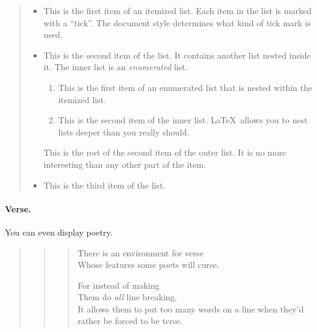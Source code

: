 \begin{quote}
\begin{itemize}
   \item  This is the first item of an itemized list.  Each item
          in the list is marked with a ``tick''.  The document
          style determines what kind of tick mark is used.

   \item  This is the second item of the list.  It contains another
          list nested inside it.  The inner list is an {\em enumerated}
          list.
          \begin{enumerate}
              \item This is the first item of an enumerated list that
                    is nested within the itemized list.

              \item This is the second item of the inner list.  \LaTeX\
                    allows you to nest lists deeper than you really should.
          \end{enumerate}
          This is the rest of the second item of the outer list.  It
          is no more interesting than any other part of the item.
   \item  This is the third item of the list.
\end{itemize}
\end{quote}

\paragraph{Verse.}
You can even display poetry.

\minusline %

\begin{quote}
\begin{quote}
\begin{verse}
   There is an environment for verse \\    %
   Whose features some poets will curse.   %


   For instead of making\\
   Them do {\em all\/} line breaking, \\
   It allows them to put too many words on a line when they'd
   rather be forced to be terse.
\end{verse}
\end{quote}
\end{quote}

